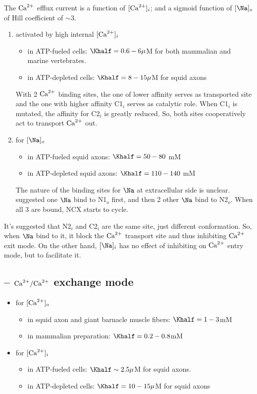 The ${\text{Ca}^{2+}}$ efflux current is a function of $[{\text{Ca}^{2+}}]_i$;  and a sigmoid
function of $[\Na]_o$ of Hill coefficient of $\sim 3$.

\begin{enumerate}
\item activated by high internal $[{\text{Ca}^{2+}}]_i$
  \begin{itemize}
  \item in ATP-fueled cells: $\Khalf = 0.6-6\mu$M for both mammalian
    and marine vertebrates.
  \item in ATP-depleted cells: $\Khalf = 8-15\mu$M for squid axons
  \end{itemize}
  With 2 ${\text{Ca}^{2+}}$ binding sites, the one of lower affinity serves as
  transported site and the one with higher affinity C1$_i$ serves as
  catalytic role. When C1$_i$ is mutated, the affinity for C2$_i$ is
  greatly reduced. So, both sites cooperatively act to transport ${\text{Ca}^{2+}}$
  out.
\item for $[\Na]_o$
  \begin{itemize}
  \item in ATP-fueled squid axons: $\Khalf = 50-80$ mM
  \item in ATP-depleted squid axons: $\Khalf = 110-140$ mM
  \end{itemize}
The nature of the binding sites for $\Na$ at extracellular side is
unclear. ~\citep{blaustein1999} suggested one $\Na$ bind to N1$_o$
first, and then 2 other $\Na$ bind to N2$_o$. When all 3 are bound,
NCX starts to cycle. 
\end{enumerate}

It's suggested that N2$_i$ and C2$_i$ are the same site, just
different conformation. So, when $\Na$ bind to it, it block the ${\text{Ca}^{2+}}$
transport site and thus inhibiting ${\text{Ca}^{2+}}$ exit mode. On the other hand,
$[\Na]_i$ has no effect of inhibiting on ${\text{Ca}^{2+}}$ entry mode, but to
facilitate it.



\subsection{-- ${\text{Ca}^{2+}}/{\text{Ca}^{2+}}$ exchange mode}
\label{sec:caca-exchange-mode}

\begin{itemize}
\item for $[{\text{Ca}^{2+}}]_o$
  \begin{itemize}
  \item in squid axon and giant barnacle muscle fibers: $\Khalf = 1-3$mM
  \item in mammalian preparation: $\Khalf = 0.2-0.8$mM 
  \end{itemize}
\item for $[{\text{Ca}^{2+}}]_i$
  \begin{itemize}
  \item in ATP-fueled cells: $\Khalf \sim 2.5\mu$M for squid axons.
  \item in ATP-depleted cells: $\Khalf = 10-15\mu$M for squid axons
  \end{itemize}
\end{itemize}

